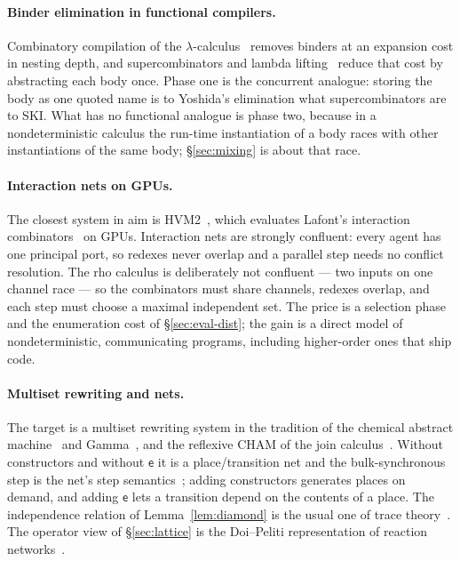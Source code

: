 \documentclass[acmsmall,screen,review,anonymous]{acmart}
\newcommand{\ev}{\mathsf{e}}
\begin{document}
\paragraph{Binder elimination in functional compilers.}
Combinatory compilation of the $\lambda$-calculus~\cite{Turner79} removes
binders at an expansion cost in nesting depth, and supercombinators and
lambda lifting~\cite{Hughes82,Johnsson85} reduce that cost by abstracting each
body once. Phase one is the concurrent analogue: storing the body as one quoted
name is to Yoshida's elimination what supercombinators are to SKI. What has no
functional analogue is phase two, because in a nondeterministic calculus the
run-time instantiation of a body races with other instantiations of the same
body; \S\ref{sec:mixing} is about that race.

\paragraph{Interaction nets on GPUs.}
The closest system in aim is HVM2~\cite{HVM2}, which evaluates Lafont's
interaction combinators~\cite{Lafont90,Lafont97} on GPUs. Interaction nets
are strongly confluent: every agent has one principal port, so redexes never
overlap and a parallel step needs no conflict resolution. The rho calculus is
deliberately not confluent --- two inputs on one channel race --- so the
combinators must share channels, redexes overlap, and each step must choose a
maximal independent set. The price is a selection phase and the enumeration
cost of \S\ref{sec:eval-dist}; the gain is a direct model of
nondeterministic, communicating programs, including higher-order ones that
ship code.

\paragraph{Multiset rewriting and nets.}
The target is a multiset rewriting system in the tradition of the chemical
abstract machine~\cite{BerryBoudol92} and Gamma~\cite{Gamma93}, and the
reflexive CHAM of the join calculus~\cite{FournetGonthier96}. Without
constructors and without $\ev$ it is a place/transition net and the
bulk-synchronous step is the net's step semantics~\cite{Reisig13}; adding
constructors generates places on demand, and adding $\ev$ lets a transition
depend on the contents of a place. The independence relation of
Lemma~\ref{lem:diamond} is the usual one of trace
theory~\cite{Mazurkiewicz87}. The operator view of \S\ref{sec:lattice} is
the Doi--Peliti representation of reaction networks~\cite{Doi76,BaezBiamonte18}.
\end{document}
